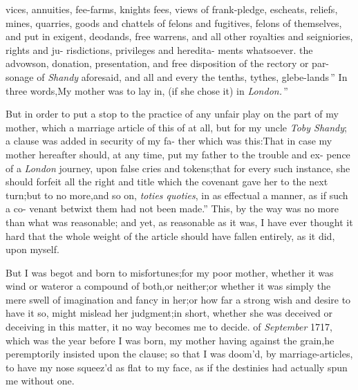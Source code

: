 \documentclass{article}
\begin{document}
\lqq vices, annuities, fee-farms, knights\break
\lqq fees, views of frank-pledge, escheats,\break
\lqq reliefs, mines, quarries, goods and\break
\lqq chattels of felons and fugitives, felons\break
\lqq of themselves, and put in exigent,\break
\lqq deodands, free warrens, and all other\break
\lqq royalties and seigniories, rights and ju-\break
\lqq risdictions, privileges and heredita-\break
\lqq ments whatsoever.\tsk {}\hbox{} the\break
\lqq advowson, donation, presentation, and\break
\lqq free disposition of the rectory or par-\break
\lqq sonage of \textit{Shandy} aforesaid, and all and\break
\lqq every the tenths, tythes, glebe-lands\,”\break
\tsh  In three words,\tsh \lqq My mother\break
\lqq was to lay in, (if she chose it) in\break
\lqq \textit{London.}\,”

But in order to put a stop to the practice of any unfair play on
the part of my mother, which a marriage article of this
of at all, but for my uncle \textit{Toby Shandy};\tsk\break 
a clause was added in security of my fa-\break
ther which was this:\tsk \lqq That in case my\break
\lqq mother hereafter should, at any time,\break
\lqq put my father to the trouble and ex-\break
\lqq pence of a \textit{London} journey, upon false\break
\lqq cries and tokens;\tsh  that for every\break
\lqq such instance, she should forfeit all the\break
\lqq right and title which the covenant gave\break
\lqq her to the next turn;\tsh  but to no\break
\lqq more,\tsk  and so on, \textit{toties quoties}, in as\break
\lqq effectual a manner, as if such a co-\break
\lqq venant betwixt them had not been\break
\lqq made.” \tsh This, by the way was no\break
more than what was reasonable;\tsk
and yet, as reasonable as
it was, I have ever thought it hard that the whole weight of the
article should have fallen entirely, as\break
it did, upon myself.\\
\newpage

But I was begot and born to misfortunes;\tsk  for my poor mother, whether it was
wind or water\tsk  or a compound of both,\tsk  or neither;\tsk  or whether it was
simply the mere swell of imagination and fancy in her;\tsk  or how far a strong wish
and desire to have it so, might mislead her judgment;\tsk  in short, whether she was
deceived or deceiving in this matter, it no way becomes me to decide.\break
{} of \textit{September} 1717, which
was the year before I was born, my mother having\break {} against the grain,\tsk he peremptorily insisted upon the clause;\tsk
so that I was doom’d, by marriage-articles, to have my nose squeez’d as flat to my
face, as if the destinies had actually spun me without one.\\
\end{document}
